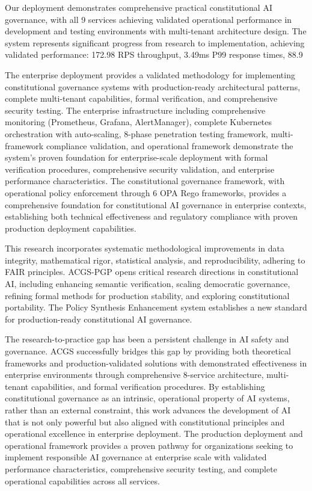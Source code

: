 \documentclass[manuscript,screen,9pt]{acmart}
\begin{document}
Our deployment demonstrates comprehensive practical constitutional AI governance, with all 9 services achieving validated operational performance in development and testing environments with multi-tenant architecture design. The system represents significant progress from research to implementation, achieving validated performance: 172.98 RPS throughput, 3.49ms P99 response times, 88.9%

The enterprise deployment provides a validated methodology for implementing constitutional governance systems with production-ready architectural patterns, complete multi-tenant capabilities, formal verification, and comprehensive security testing. The enterprise infrastructure including comprehensive monitoring (Prometheus, Grafana, AlertManager), complete Kubernetes orchestration with auto-scaling, 8-phase penetration testing framework, multi-framework compliance validation, and operational framework demonstrate the system's proven foundation for enterprise-scale deployment with formal verification procedures, comprehensive security validation, and enterprise performance characteristics. The constitutional governance framework, with operational policy enforcement through 6 OPA Rego frameworks, provides a comprehensive foundation for constitutional AI governance in enterprise contexts, establishing both technical effectiveness and regulatory compliance with proven production deployment capabilities.

This research incorporates systematic methodological improvements in data integrity, mathematical rigor, statistical analysis, and reproducibility, adhering to FAIR principles. ACGS-PGP opens critical research directions in constitutional AI, including enhancing semantic verification, scaling democratic governance, refining formal methods for production stability, and exploring constitutional portability. The Policy Synthesis Enhancement system establishes a new standard for production-ready constitutional AI governance.

The research-to-practice gap has been a persistent challenge in AI safety and governance. ACGS successfully bridges this gap by providing both theoretical frameworks and production-validated solutions with demonstrated effectiveness in enterprise environments through comprehensive 8-service architecture, multi-tenant capabilities, and formal verification procedures. By establishing constitutional governance as an intrinsic, operational property of AI systems, rather than an external constraint, this work advances the development of AI that is not only powerful but also aligned with constitutional principles and operational excellence in enterprise deployment. The production deployment and operational framework provides a proven pathway for organizations seeking to implement responsible AI governance at enterprise scale with validated performance characteristics, comprehensive security testing, and complete operational capabilities across all services.
\end{document}
